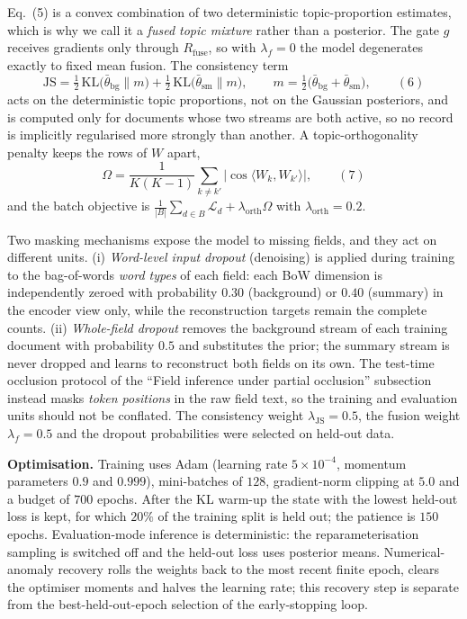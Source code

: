 \documentclass[Journal,letterpaper,NoLists]{ascelike-new}
\begin{document}
Eq.~(5) is a convex combination of two deterministic topic-proportion estimates,
which is why we call it a \emph{fused topic mixture} rather than a posterior. The gate
$g$ receives gradients only through $R_{\mathrm{fuse}}$, so with $\lambda_f=0$ the model
degenerates exactly to fixed mean fusion. The consistency term
\begin{equation}
\mathrm{JS}=\tfrac12\,\mathrm{KL}\!\big(\bar\theta_{\mathrm{bg}}\|m\big)
+\tfrac12\,\mathrm{KL}\!\big(\bar\theta_{\mathrm{sm}}\|m\big),
\qquad m=\tfrac12\big(\bar\theta_{\mathrm{bg}}+\bar\theta_{\mathrm{sm}}\big),
\qquad(6)\end{equation}
acts on the deterministic topic proportions, not on the Gaussian posteriors, and is computed only
for documents whose two streams are both active, so no record is implicitly regularised more
strongly than another. A topic-orthogonality penalty keeps the rows of $W$ apart,
\begin{equation}
\Omega=\frac{1}{K(K-1)}\sum_{k\neq k'}\big|\cos\langle W_k,W_{k'}\rangle\big|,
\qquad(7)\end{equation}
and the batch objective is $\frac{1}{|B|}\sum_{d\in B}\mathcal{L}_d
+\lambda_{\mathrm{orth}}\Omega$ with $\lambda_{\mathrm{orth}}=0.2$.

Two masking mechanisms expose the model to missing fields, and they act on different units.
(i) \emph{Word-level input dropout} (denoising) is applied during training to the bag-of-words
\emph{word types} of each field: each BoW dimension is independently zeroed with probability
$0.30$ (background) or $0.40$ (summary) in the encoder view only, while the reconstruction
targets remain the complete counts. (ii) \emph{Whole-field dropout} removes the background stream
of each training document with probability $0.5$ and substitutes the prior; the summary stream is
never dropped and learns to reconstruct both fields on its own. The test-time occlusion protocol
of the ``Field inference under partial occlusion'' subsection instead masks \emph{token positions} in the raw field text, so the
training and evaluation units should not be conflated. The consistency weight
$\lambda_{\mathrm{JS}}=0.5$, the fusion weight $\lambda_f=0.5$ and the dropout probabilities were
selected on held-out data.

\noindent\textbf{Optimisation.} Training uses Adam (learning rate $5\times10^{-4}$, momentum parameters $0.9$ and $0.999$),
mini-batches of $128$, gradient-norm clipping at $5.0$ and a budget of $700$ epochs. After the KL
warm-up the state with the lowest held-out loss is kept, for which $20\%$ of the training split is
held out; the patience is $150$ epochs. Evaluation-mode inference is deterministic: the
reparameterisation sampling is switched off and the held-out loss uses posterior means.
Numerical-anomaly recovery rolls the weights back to the most recent finite epoch, clears the
optimiser moments and halves the learning rate; this recovery step is separate from the
best-held-out-epoch selection of the early-stopping loop.
\end{document}
